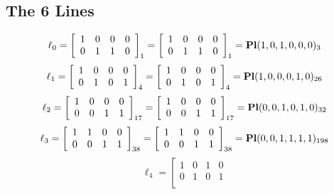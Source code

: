 \documentclass{article}
\begin{document}
{\subsection*{The 6 Lines}
$$
\ell_{0} = 
\left[
\begin{array}{*{4}{r}}
1 & 0 & 0 & 0\\
0 & 1 & 1 & 0\\
\end{array}
\right]
_{1}
=
\left[
\begin{array}{*{4}c}
1  & 0  & 0  & 0\\
0  & 1  & 1  & 0\\
\end{array}
\right]_{1}
={\rm\bf Pl}(1,0,1,0,0,0 )_{3}$$
$$
\ell_{1} = 
\left[
\begin{array}{*{4}{r}}
1 & 0 & 0 & 0\\
0 & 1 & 0 & 1\\
\end{array}
\right]
_{4}
=
\left[
\begin{array}{*{4}c}
1  & 0  & 0  & 0\\
0  & 1  & 0  & 1\\
\end{array}
\right]_{4}
={\rm\bf Pl}(1,0,0,0,1,0 )_{26}$$
$$
\ell_{2} = 
\left[
\begin{array}{*{4}{r}}
1 & 0 & 0 & 0\\
0 & 0 & 1 & 1\\
\end{array}
\right]
_{17}
=
\left[
\begin{array}{*{4}c}
1  & 0  & 0  & 0\\
0  & 0  & 1  & 1\\
\end{array}
\right]_{17}
={\rm\bf Pl}(0,0,1,0,1,0 )_{32}$$
$$
\ell_{3} = 
\left[
\begin{array}{*{4}{r}}
1 & 1 & 0 & 0\\
0 & 0 & 1 & 1\\
\end{array}
\right]
_{38}
=
\left[
\begin{array}{*{4}c}
1  & 1  & 0  & 0\\
0  & 0  & 1  & 1\\
\end{array}
\right]_{38}
={\rm\bf Pl}(0,0,1,1,1,1 )_{198}$$
$$
\ell_{4} = 
\left[
\begin{array}{*{4}{r}}
1 & 0 & 1 & 0\\
0 & 1 & 0 & 1\\
\end{array}
$$}
\end{document}
